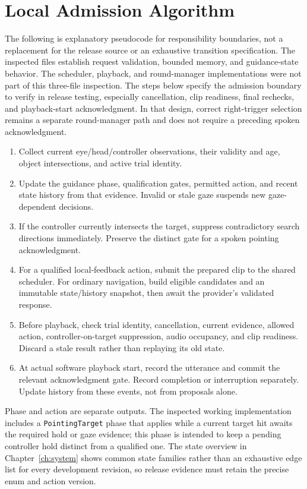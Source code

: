 \section{Local Admission Algorithm}
The following is explanatory pseudocode for responsibility boundaries, not a replacement for the release source or an exhaustive transition specification. The inspected files establish request validation, bounded memory, and guidance-state behavior. The scheduler, playback, and round-manager implementations were not part of this three-file inspection. The steps below specify the admission boundary to verify in release testing, especially cancellation, clip readiness, final rechecks, and playback-start acknowledgment. In that design, correct right-trigger selection remains a separate round-manager path and does not require a preceding spoken acknowledgment.
\begin{enumerate}
\item Collect current eye/head/controller observations, their validity and age, object intersections, and active trial identity.
\item Update the guidance phase, qualification gates, permitted action, and recent state history from that evidence. Invalid or stale gaze suspends new gaze-dependent decisions.
\item If the controller currently intersects the target, suppress contradictory search directions immediately. Preserve the distinct gate for a spoken pointing acknowledgment.
\item For a qualified local-feedback action, submit the prepared clip to the shared scheduler. For ordinary navigation, build eligible candidates and an immutable state/history snapshot, then await the provider's validated response.
\item Before playback, check trial identity, cancellation, current evidence, allowed action, controller-on-target suppression, audio occupancy, and clip readiness. Discard a stale result rather than replaying its old state.
\item At actual software playback start, record the utterance and commit the relevant acknowledgment gate. Record completion or interruption separately. Update history from these events, not from proposals alone.
\end{enumerate}

Phase and action are separate outputs. The inspected working implementation includes a \texttt{PointingTarget} phase that applies while a current target hit awaits the required hold or gaze evidence; this phase is intended to keep a pending controller hold distinct from a qualified one. The state overview in Chapter~\ref{ch:system} shows common state families rather than an exhaustive edge list for every development revision, so release evidence must retain the precise enum and action version.

